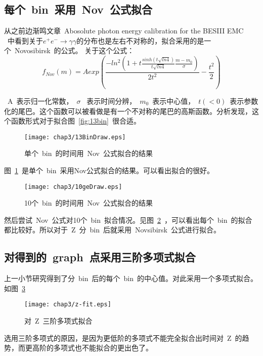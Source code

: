 \subsection{每个~bin~采用~Nov~公式拟合}

从之前边渐鸣文章~Abosolute photon energy calibration for the BESIII EMC~ \cite{Bian:2010aa}~中看到关于${e^{+}e^{-} \to \gamma \gamma}$的分布也是左右不对称的，拟合采用的是一个~Novosibirsk~的公式。
关于这个公式：
\begin{displaymath}
f_{Nov}(m)=Aexp(\frac{-ln^2(1+t\frac{sinh(t\sqrt{ln4})}{t\sqrt{ln4}}\frac{m-m_{0}}{\sigma})}{2t^2}-\frac{t^2}{2}) %
\end{displaymath}


~A~表示归一化常数，~$\sigma$~
表示时间分辨，~$m_{0}$~表示中心值，~$t(<0)$~表示参数化的尾巴。这个函数可以被看做是有一个不对称的尾巴的高斯函数。分析发现，这个函数形式对于拟合图~\ref{fig:13bin}~很合适。

\begin{figure}[htbp]
\centering
\texttt{[image: chap3/13BinDraw.eps]}
\caption{单个~bin~的时间用~Nov~公式拟合的结果}
\label{fig:13BinDraw}
\end{figure}

图~\ref{fig:13BinDraw}~是单个~bin~采用Nov公式拟合的结果。可以看出拟合的很好。

\begin{figure}[htbp]
\centering
\texttt{[image: chap3/10geDraw.eps]}
\caption{10个~bin~的时间用~Nov~公式拟合的结果}
\label{fig:10geDraw}
\end{figure}

然后尝试~Nov~公式对10个~bin~拟合情况。见图~\ref{fig:10geDraw}~，可以看出每个~bin~的拟合都比较好。所以对于~Z~分~bin~后就采用~Novsibirsk~公式进行拟合。

\subsection{对得到的~graph~点采用三阶多项式拟合}
上一小节研究得到了分~bin~后的每个~bin~的中心值。对此采用一个多项式拟合。如图~\ref{fig:z-fit}~

\begin{figure}[htbp]
\centering
\texttt{[image: chap3/z-fit.eps]}
\caption{对~Z~三阶多项式拟合}
\label{fig:z-fit}
\end{figure}

选用三阶多项式的原因，是因为更低阶的多项式不能完全拟合出时间对~Z~的趋势，而更高阶的多项式也不能拟合的更出色了。

